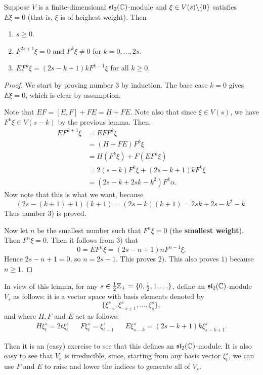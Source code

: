 \documentclass[11pt, english]{article}
\begin{document}
\begin{lemma}
Suppose $V$ is a finite-dimensional $\mathfrak{sl}_2(\mathbb{C})$-module and $\xi \in V(s) \backslash \{ 0 \}$ satisfies $E \xi = 0$ (that is, $\xi$ is of heighest weight). Then
\begin{enumerate}
\item $s \geq 0$.
\item $F^{2s+1}\xi = 0$ and $F^k\xi \neq 0$ for $k=0,\ldots,2s$. 
\item $EF^k \xi = (2s-k+1)kF^{k-1} \xi$ for all $k \geq 0$.
\end{enumerate}
\end{lemma}
\begin{proof}

We start by proving number 3 by induction. The base case $k=0$ gives $E \xi = 0$, which is clear by assumption.

Note that $EF = [E,F]+FE = H+FE$. Note also that since $\xi \in V(s)$, we have $F^k \xi \in V(s-k)$ by the previous lemma. Then:
\begin{align*}
  EF^{k+1} \xi &= EF F^k \xi \\
&= (H+FE) F^k \xi \\
&= H(F^k \xi) + F(EF^k \xi) \\
&= 2(s-k)F^k \xi + (2s-k+1)k F^k \xi \\
&= (2s-k+2sk-k^2) F^k \alpha.
\end{align*}
Now note that this is what we want, because
$$
(2s-(k+1)+1)(k+1) = (2s-k)(k+1) = 2sk+2s-k^2-k.
$$
Thus number 3) is proved.

Now let $n$ be the smallest number such that $F^n \xi = 0$ (the \textbf{smallest weight}). Then $F^n \xi = 0$. Then it follows from 3) that
$$
0 = EF^n \xi = (2s-n+1)nF^{n-1} \xi.
$$
Hence $2s-n+1=0$, so $n=2s+1$. This proves $2)$. This also proves $1)$ because $n \geq 1$. 
\end{proof}

In view of this lemma, for any $s \in \frac 12 \mathbb{Z}_+ = \{ 0, \frac 12, 1, \ldots \}$, define an $\mathfrak{sl}_2(\mathbb{C})$-module $V_s$ as follows: it is a vector space with basis elements denoted by
$$
\{ \xi_{-s}^s, \xi_{-s+1}^s, \ldots, \xi_s^s \},
$$
and where $H,F$ and $E$ act as follows:
\begin{align*}
 H \xi_t^s = 2t \xi_t^s && F\xi_t^s = \xi_{t-1}^s && E \xi_{s-k}^s = (2s-k+1)k\xi_{s-k+1}^s.
\end{align*}

Then it is an (easy) exercise to see that this defines an $\mathfrak{sl}_2(\mathbb{C})$-module. It is also easy to see that $V_s$ is irreducible, since, starting from any basis vector $\xi_t^s$, we can use $F$ and $E$ to raise and lower the indices to generate all of $V_s$.
\end{document}
